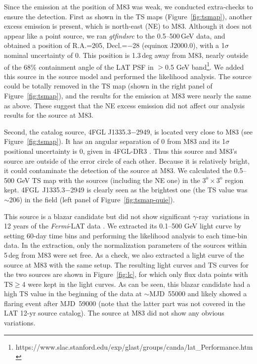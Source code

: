 \documentclass[twocolumn]{aastex631}
\newcommand{\fermi}{\textit{Fermi}}
\newcommand{\gr}{$\gamma$-ray}
\begin{document}
Since the emission at the position of M83 was weak, we conducted extra-checks
to ensure the detection. First as shown in the TS maps (Figure~\ref{fig:tsmap}),
another excess emission is present, which is north-east (NE) to M83. Although
it does not appear like a point source, we ran \textit{gtfindsrc} to 
the 0.5--500\,GeV data, and obtained a position of R.A.=205, 
Decl.=$-$28 (equinox J2000.0), with a 1$\sigma$ nominal uncertainty 
of 0. This position is 1.3\,deg away from M83, nearly outside of 
the 68\% containment angle of the LAT PSF in $>$0.5 GeV 
band\footnote{\footnotesize https://www.slac.stanford.edu/exp/glast/groups/canda/lat\_Performance.htm}. 
We added this source in the source model and performed the likelihood analysis.
The source could be totally removed in the TS map (shown in the right panel 
of Figure~\ref{fig:tsmap}), and the results for the emission at M83 were 
nearly the same as above.
These suggest that the NE excess emission did not affect our analysis results 
for the source at M83.
 
Second, the catalog source, 4FGL J1335.3$-$2949, is located very close 
to M83 (see Figure~\ref{fig:tsmap}).
It has an angular separation of 0 from M83 and its
1$\sigma$ positional uncertainty is 0, given in 
4FGL-DR3 \citep{4fgl-dr3}. Thus this source and M83's source are 
outside of the error circle of 
each other. Because it is relatively bright, 
it could contaminate the detection of the source at M83. 
We calculated the 0.5--500 GeV TS map with the sources (including the NE one) 
in the $\mathrm{3^{o}\times3^{o}}$ region kept. 4FGL~J1335.3$-$2949 is clearly 
seen as the brightest one (the TS value was $\sim$206)
in the field (left panel of Figure~\ref{fig:tsmap-quie}). 

This source is a blazar candidate but did not show significant \gr\ 
variations in 12 years of the \fermi-LAT data \citep{4fgl-dr3}. 
We extracted its 0.1--500 GeV light curve by setting 60-day time bins 
and performing the likelihood analysis to each time-bin data. 
In the extraction, only the normalization parameters of the sources 
within 5\,deg from M83 were set free. As a check, we also extracted a
light curve of the source at M83 with the same setup. 
The resulting light curves and TS curves for the two sources are shown
in Figure~\ref{fig:lc}, for which only flux data points with 
TS$\geq$4 were kept in the light curves. 
As can be seen, this blazar candidate had a high TS value in the beginning 
of the data at $\sim$MJD~55000 and likely showed a flaring event after
MJD~59000 (note that the latter part was not covered in the LAT 12-yr source
catalog). The source at M83 did not show any obvious variations.
\end{document}
